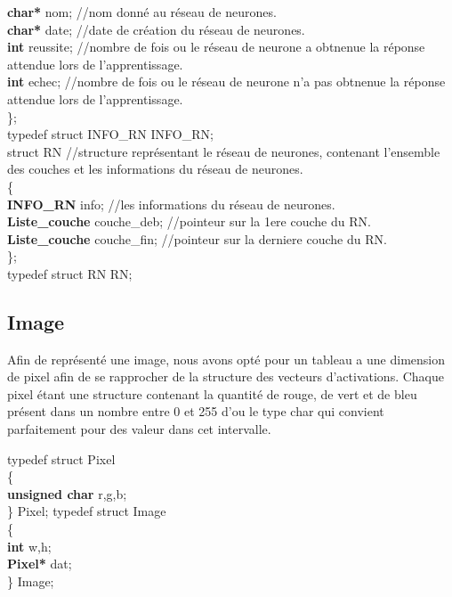 \documentclass{article}
\newcommand\tab[1][1cm]{\hspace*{#1}}
\begin{document}
\begin{flushleft}
			\tab \textcolor{myblue}{\textbf{char*}} nom;	//nom donné au réseau de neurones.\\
			\tab \textcolor{myblue}{\textbf{char*}} date;	//date de création du réseau de neurones.\\
			\tab \textcolor{myblue}{\textbf{int}} reussite;	//nombre de fois ou le réseau de neurone a obtnenue la réponse attendue lors de l'apprentissage.\\
			\tab \textcolor{myblue}{\textbf{int}} echec;	//nombre de fois ou le réseau de neurone n'a pas obtnenue la réponse attendue lors de l'apprentissage.\\
		\};\\
		\bigbreak
		typedef struct INFO\_RN INFO\_RN;\\
		\bigbreak
		struct RN	//structure représentant le réseau de neurones, contenant l'ensemble des couches et les informations du réseau de neurones.\\
		\{\\
			\tab \textcolor{myblue}{\textbf{INFO\_RN}} info;	//les informations du réseau de neurones.\\
			\tab \textcolor{myblue}{\textbf{Liste\_couche}} couche\_deb;	//pointeur sur la 1ere couche du RN.\\
			\tab \textcolor{myblue}{\textbf{Liste\_couche}} couche\_fin;    //pointeur sur la derniere couche du RN.\\
		\};\\
		\bigbreak
		typedef struct RN RN;
		
	\end{flushleft}
	
	\subsection{Image}
	Afin de représenté une image, nous avons opté pour un tableau a une dimension de pixel afin de se rapprocher de la structure des vecteurs d'activations. Chaque pixel étant une structure contenant la quantité de rouge, de vert et de bleu présent dans un nombre entre 0 et 255 d'ou le type char qui convient parfaitement pour des valeur dans cet intervalle.
	\begin{flushleft}
		typedef struct Pixel\\
			\{\\
				\tab \textcolor{myblue}{\textbf{unsigned char}} r,g,b;\\
			\} Pixel;
		\bigbreak
		typedef struct Image\\
			\{\\
				\tab \textcolor{myblue}{\textbf{int}} w,h;\\
				\tab \textcolor{myblue}{\textbf{Pixel*}} dat;\\
			\} Image;
	\end{flushleft}
	
\end{document}
